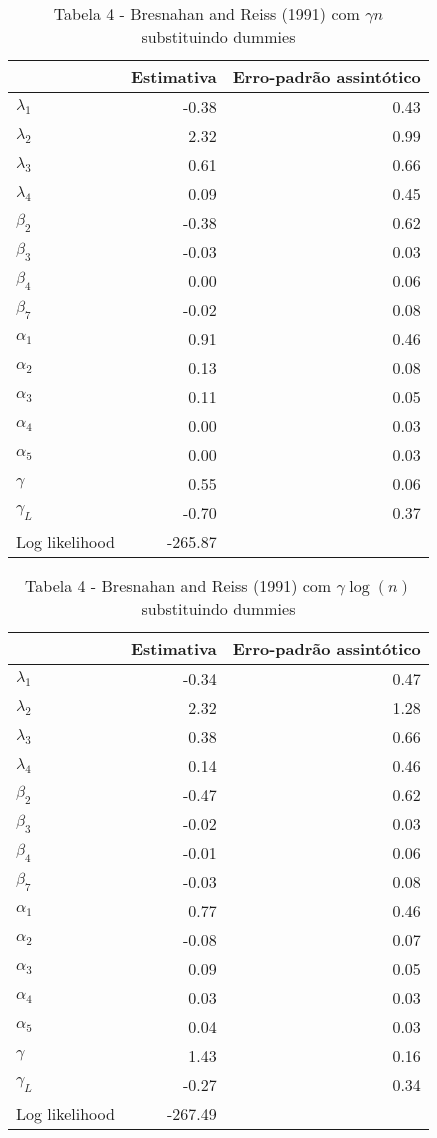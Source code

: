 \documentclass[
  12pt,
]{article}
\begin{document}
\begin{table}[H]

\caption{\label{tab:unnamed-chunk-15}Tabela 4 - Bresnahan and Reiss (1991) com $\gamma n$ substituindo dummies}
\centering
\begin{tabular}[t]{lrr}
\toprule
  & Estimativa & Erro-padrão assintótico\\
\midrule
$\lambda_1$ & -0.38 & 0.43\\
$\lambda_2$ & 2.32 & 0.99\\
$\lambda_3$ & 0.61 & 0.66\\
$\lambda_4$ & 0.09 & 0.45\\
$\beta_2$ & -0.38 & 0.62\\
$\beta_3$ & -0.03 & 0.03\\
$\beta_4$ & 0.00 & 0.06\\
$\beta_7$ & -0.02 & 0.08\\
$\alpha_1$ & 0.91 & 0.46\\
$\alpha_2$ & 0.13 & 0.08\\
$\alpha_3$ & 0.11 & 0.05\\
$\alpha_4$ & 0.00 & 0.03\\
$\alpha_5$ & 0.00 & 0.03\\
$\gamma$ & 0.55 & 0.06\\
$\gamma_L$ & -0.70 & 0.37\\
Log likelihood & -265.87 & \\
\bottomrule
\end{tabular}
\end{table}

\begin{table}[H]

\caption{\label{tab:unnamed-chunk-17}Tabela 4 - Bresnahan and Reiss (1991) com $\gamma \log(n)$ substituindo dummies}
\centering
\begin{tabular}[t]{lrr}
\toprule
  & Estimativa & Erro-padrão assintótico\\
\midrule
$\lambda_1$ & -0.34 & 0.47\\
$\lambda_2$ & 2.32 & 1.28\\
$\lambda_3$ & 0.38 & 0.66\\
$\lambda_4$ & 0.14 & 0.46\\
$\beta_2$ & -0.47 & 0.62\\
$\beta_3$ & -0.02 & 0.03\\
$\beta_4$ & -0.01 & 0.06\\
$\beta_7$ & -0.03 & 0.08\\
$\alpha_1$ & 0.77 & 0.46\\
$\alpha_2$ & -0.08 & 0.07\\
$\alpha_3$ & 0.09 & 0.05\\
$\alpha_4$ & 0.03 & 0.03\\
$\alpha_5$ & 0.04 & 0.03\\
$\gamma$ & 1.43 & 0.16\\
$\gamma_L$ & -0.27 & 0.34\\
Log likelihood & -267.49 & \\
\bottomrule
\end{tabular}
\end{table}
\end{document}
